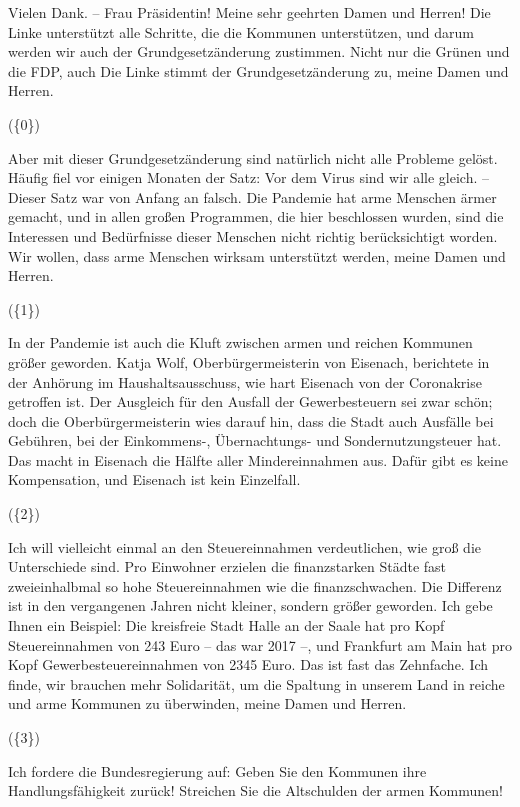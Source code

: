 \begin{example}[H]
    Vielen Dank. – Frau Präsidentin! Meine sehr geehrten Damen und Herren! Die Linke unterstützt alle Schritte, die die Kommunen unterstützen, und darum werden wir auch der Grundgesetzänderung zustimmen. Nicht nur die Grünen und die FDP, auch Die Linke stimmt der Grundgesetzänderung zu, meine Damen und Herren.
    
    (\{0\})
    
    Aber mit dieser Grundgesetzänderung sind natürlich nicht alle Probleme gelöst. Häufig fiel vor einigen Monaten der Satz: Vor dem Virus sind wir alle gleich. – Dieser Satz war von Anfang an falsch. Die Pandemie hat arme Menschen ärmer gemacht, und in allen großen Programmen, die hier beschlossen wurden, sind die Interessen und Bedürfnisse dieser Menschen nicht richtig berücksichtigt worden. Wir wollen, dass arme Menschen wirksam unterstützt werden, meine Damen und Herren.
    
    (\{1\})
    
    In der Pandemie ist auch die Kluft zwischen armen und reichen Kommunen größer geworden. Katja Wolf, Oberbürgermeisterin von Eisenach, berichtete in der Anhörung im Haushaltsausschuss, wie hart Eisenach von der Coronakrise getroffen ist. Der Ausgleich für den Ausfall der Gewerbesteuern sei zwar schön; doch die Oberbürgermeisterin wies darauf hin, dass die Stadt auch Ausfälle bei Gebühren, bei der Einkommens-, Übernachtungs- und Sondernutzungsteuer hat. Das macht in Eisenach die Hälfte aller Mindereinnahmen aus. Dafür gibt es keine Kompensation, und Eisenach ist kein Einzelfall.
    
    (\{2\})
    
    Ich will vielleicht einmal an den Steuereinnahmen verdeutlichen, wie groß die Unterschiede sind. Pro Einwohner erzielen die finanzstarken Städte fast zweieinhalbmal so hohe Steuereinnahmen wie die finanzschwachen. Die Differenz ist in den vergangenen Jahren nicht kleiner, sondern größer geworden. Ich gebe Ihnen ein Beispiel: Die kreisfreie Stadt Halle an der Saale hat pro Kopf Steuereinnahmen von 243 Euro – das war 2017 –, und Frankfurt am Main hat pro Kopf Gewerbesteuereinnahmen von 2345 Euro. Das ist fast das Zehnfache. Ich finde, wir brauchen mehr Solidarität, um die Spaltung in unserem Land in reiche und arme Kommunen zu überwinden, meine Damen und Herren.
    
    (\{3\})
    
    Ich fordere die Bundesregierung auf: Geben Sie den Kommunen ihre Handlungsfähigkeit zurück! Streichen Sie die Altschulden der armen Kommunen!
    

\end{example}
